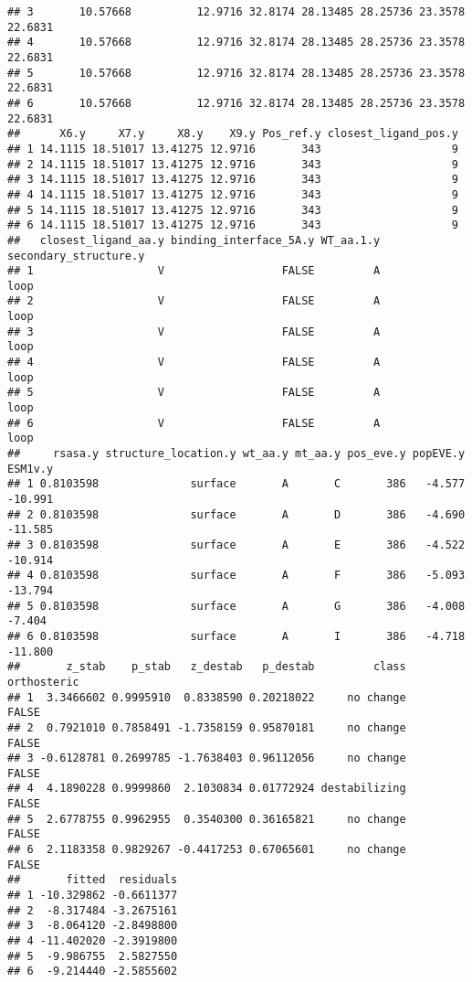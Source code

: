 \documentclass[
]{article}
\begin{document}
\begin{verbatim}
## 3       10.57668          12.9716 32.8174 28.13485 28.25736 23.3578 22.6831
## 4       10.57668          12.9716 32.8174 28.13485 28.25736 23.3578 22.6831
## 5       10.57668          12.9716 32.8174 28.13485 28.25736 23.3578 22.6831
## 6       10.57668          12.9716 32.8174 28.13485 28.25736 23.3578 22.6831
##      X6.y     X7.y     X8.y    X9.y Pos_ref.y closest_ligand_pos.y
## 1 14.1115 18.51017 13.41275 12.9716       343                    9
## 2 14.1115 18.51017 13.41275 12.9716       343                    9
## 3 14.1115 18.51017 13.41275 12.9716       343                    9
## 4 14.1115 18.51017 13.41275 12.9716       343                    9
## 5 14.1115 18.51017 13.41275 12.9716       343                    9
## 6 14.1115 18.51017 13.41275 12.9716       343                    9
##   closest_ligand_aa.y binding_interface_5A.y WT_aa.1.y secondary_structure.y
## 1                   V                  FALSE         A                  loop
## 2                   V                  FALSE         A                  loop
## 3                   V                  FALSE         A                  loop
## 4                   V                  FALSE         A                  loop
## 5                   V                  FALSE         A                  loop
## 6                   V                  FALSE         A                  loop
##     rsasa.y structure_location.y wt_aa.y mt_aa.y pos_eve.y popEVE.y ESM1v.y
## 1 0.8103598              surface       A       C       386   -4.577 -10.991
## 2 0.8103598              surface       A       D       386   -4.690 -11.585
## 3 0.8103598              surface       A       E       386   -4.522 -10.914
## 4 0.8103598              surface       A       F       386   -5.093 -13.794
## 5 0.8103598              surface       A       G       386   -4.008  -7.404
## 6 0.8103598              surface       A       I       386   -4.718 -11.800
##       z_stab    p_stab   z_destab   p_destab         class orthosteric
## 1  3.3466602 0.9995910  0.8338590 0.20218022     no change       FALSE
## 2  0.7921010 0.7858491 -1.7358159 0.95870181     no change       FALSE
## 3 -0.6128781 0.2699785 -1.7638403 0.96112056     no change       FALSE
## 4  4.1890228 0.9999860  2.1030834 0.01772924 destabilizing       FALSE
## 5  2.6778755 0.9962955  0.3540300 0.36165821     no change       FALSE
## 6  2.1183358 0.9829267 -0.4417253 0.67065601     no change       FALSE
##       fitted  residuals
## 1 -10.329862 -0.6611377
## 2  -8.317484 -3.2675161
## 3  -8.064120 -2.8498800
## 4 -11.402020 -2.3919800
## 5  -9.986755  2.5827550
## 6  -9.214440 -2.5855602
\end{verbatim}
\end{document}
